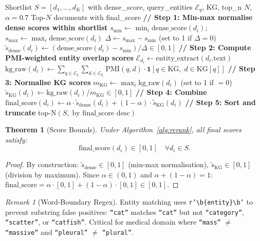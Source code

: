 \documentclass[12pt,a4paper]{article}
\theoremstyle{definition}
\theoremstyle{plain}
\newtheorem{theorem}{Theorem}[section]
\theoremstyle{remark}
\newtheorem{remark}{Remark}[section]
\begin{document}
\begin{algorithm}[H]
\caption{NERKGReranker.rerank}
\label{alg:rerank}
\begin{algorithmic}[1]
\Require Shortlist $S = [d_1, \ldots, d_K]$ with dense\_score, query\_entities $\mathcal{E}_q$,
         KG, top\_n $N$, $\alpha = 0.7$
\Ensure Top-$N$ documents with final\_score
\State \textbf{// Step 1: Min-max normalise dense scores within shortlist}
\State $s_{\min} \gets \min_i \text{dense\_score}(d_i)$;
       $s_{\max} \gets \max_i \text{dense\_score}(d_i)$
\State $\Delta \gets s_{\max} - s_{\min}$ (set to 1 if $\Delta = 0$)
\State $\tilde{s}_{\text{dense}}(d_i) \gets (\text{dense\_score}(d_i) - s_{\min}) / \Delta \in [0,1]$
\State \textbf{// Step 2: Compute PMI-weighted entity overlap scores}
  \State $\mathcal{E}_{d_i} \gets \text{entity\_extract}(d_i.\text{text})$
  \State $\text{kg\_raw}(d_i) \gets
    \sum_{q \in \mathcal{E}_q}\sum_{d \in \mathcal{E}_{d_i}}
    \mathrm{PMI}(q, d) \cdot \mathbf{1}[q \in \mathrm{KG},\; d \in \mathrm{KG}[q]]$
\EndFor
\State \textbf{// Step 3: Normalise KG scores}
\State $m_\mathrm{KG} \gets \max_i \text{kg\_raw}(d_i)$ (set to 1 if $= 0$)
\State $\tilde{s}_{\text{KG}}(d_i) \gets \text{kg\_raw}(d_i) / m_\mathrm{KG} \in [0,1]$
\State \textbf{// Step 4: Combine}
  \State $\text{final\_score}(d_i) \gets
    \alpha \cdot \tilde{s}_{\text{dense}}(d_i) + (1-\alpha)\cdot\tilde{s}_{\text{KG}}(d_i)$
\EndFor
\State \textbf{// Step 5: Sort and truncate}
\State \Return $\mathrm{top\text{-}N}\!\left(S,\; \text{by final\_score desc}\right)$
\end{algorithmic}
\end{algorithm}

\begin{theorem}[Score Bounds]
Under Algorithm~\ref{alg:rerank}, all final scores satisfy:
\[
  \text{final\_score}(d_i) \in [0, 1] \quad \forall d_i \in S.
\]
\end{theorem}
\begin{proof}
By construction: $\tilde{s}_{\text{dense}} \in [0,1]$ (min-max normalisation),
$\tilde{s}_{\text{KG}} \in [0,1]$ (division by maximum).
Since $\alpha \in (0,1)$ and $\alpha + (1-\alpha) = 1$:
$\text{final\_score} = \alpha\cdot[0,1] + (1-\alpha)\cdot[0,1] \in [0,1]$.
\end{proof}

\begin{remark}[Word-Boundary Regex]
Entity matching uses \texttt{r'\textbackslash b\{entity\}\textbackslash b'} to prevent
substring false positives: \texttt{``cat''} matches \texttt{``cat''} but not
\texttt{``category''}, \texttt{``scatter''}, or \texttt{``catfish''}. Critical for
medical domain where \texttt{``mass''} $\ne$ \texttt{``massive''} and
\texttt{``pleural''} $\ne$ \texttt{``plural''}.
\end{remark}
\end{document}
